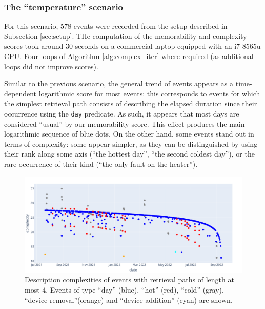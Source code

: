 \documentclass[entropy,article,submit,moreauthors,pdftex]{Definitions/mdpi}
\begin{document}
\subsubsection{The ``temperature'' scenario}

For this scenario, 578 events were recorded from the setup described in Subsection \ref{sec:setup}. THe computation of the memorability and complexity scores took around 30 seconds on a commercial laptop equipped with an i7-8565u CPU. Four loops of Algorithm \ref{alg:complex_iter} where required (as additional loops did not improve scores).

Similar to the previous scenario, the general trend of events appears as a time-dependent logarithmic score for most events: this corresponds to events for which the simplest retrieval path consists of describing the elapsed duration since their occurrence using the \texttt{day} predicate. As such, it appears that most days are considered ``usual'' by our memorability score. This effect produces the main logarithmic sequence of blue dots. On the other hand, some events stand out in terms of
complexity: some appear simpler, as they can be distinguished by using their
rank along some axis (``the hottest day'', ``the second coldest day''), or the rare occurrence of their kind (``the only fault on the heater'').

\begin{figure}[!ht]
    \centering
    \includegraphics[width=.9\linewidth]{figures/complexity_scenar_2.png}
    \caption{Description complexities of events with retrieval paths of
        length at most 4. Events of type ``day'' (blue), ``hot'' (red), ``cold''
        (gray), ``device removal''(orange) and ``device addition'' (cyan) are shown.}
    \label{fig:computed_cplx}
\end{figure}
\end{document}

